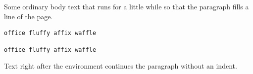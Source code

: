 \documentclass{article}
\begin{document}
Some ordinary body text that runs for a little while so that the paragraph fills a line of the page.
\begin{lstlisting}
office fluffy affix waffle
\end{lstlisting}
\begin{lstlisting}[basicstyle=\ttfamily]
office fluffy affix waffle
\end{lstlisting}
Text right after the environment continues the paragraph without an indent.
\end{document}
